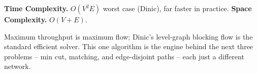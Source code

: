 \begin{complexitybox}
\textbf{Time Complexity.} $O(V^2 E)$ worst case (Dinic), far faster in
practice. \textbf{Space Complexity.} $O(V+E)$.
\end{complexitybox}

\begin{takeawaybox}
Maximum throughput is maximum flow; Dinic's level-graph blocking flow is the
standard efficient solver. This one algorithm is the engine behind the next
three problems -- min cut, matching, and edge-disjoint paths -- each just a
different network.
\end{takeawaybox}
